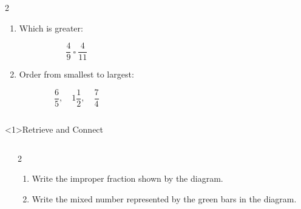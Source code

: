 \documentclass{beamer}
\newcommand{\ashow}[1]{\uncover<2->{\textcolor{red}{\small #1}}}
\begin{document}
\begin{frame}
\begin{columns}
\begin{multicols}{2}
\begin{enumerate}
\item Which is greater:

\[
\frac{4}{9}\ \square\ \frac{4}{11}
\]
\ashow{$\frac{4}{9}$}

\item Order from smallest to largest:

\[
\frac{6}{5},\quad 1\frac{1}{2},\quad \frac{7}{4}
\]
\ashow{$\frac{6}{5},\ 1\frac{1}{2},\ \frac{7}{4}$}

\end{enumerate}

\end{multicols}

\end{columns}

\end{frame}
\begin{frame}<1>{Retrieve and Connect}

\vspace{-2.5em}

\begin{columns}


\begin{center}
\end{center}


\small
\begin{multicols}{2}

\begin{enumerate}

\item Write the improper fraction shown by the diagram. \ashow{$\frac{5}{4}$}

\item Write the mixed number represented by the green bars in the diagram. \ashow{$1\frac{1}{4}$}


\end{enumerate}
\end{multicols}
\end{columns}
\end{frame}
\end{document}
